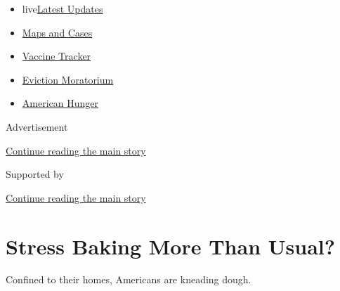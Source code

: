 \begin{itemize}
\tightlist
\item
  live\href{https://www.nytimes3xbfgragh.onion/2020/09/08/world/covid-19-coronavirus.html?name=styln-coronavirus-national\&region=TOP_BANNER\&block=storyline_menu_recirc\&action=click\&pgtype=Article\&impression_id=808c40d0-f267-11ea-aa98-cfc271ad1787\&variant=undefined}{Latest
  Updates}
\item
  \href{https://www.nytimes3xbfgragh.onion/interactive/2020/us/coronavirus-us-cases.html?name=styln-coronavirus-national\&region=TOP_BANNER\&block=storyline_menu_recirc\&action=click\&pgtype=Article\&impression_id=808c40d1-f267-11ea-aa98-cfc271ad1787\&variant=undefined}{Maps
  and Cases}
\item
  \href{https://www.nytimes3xbfgragh.onion/interactive/2020/science/coronavirus-vaccine-tracker.html?name=styln-coronavirus-national\&region=TOP_BANNER\&block=storyline_menu_recirc\&action=click\&pgtype=Article\&impression_id=808c40d2-f267-11ea-aa98-cfc271ad1787\&variant=undefined}{Vaccine
  Tracker}
\item
  \href{https://www.nytimes3xbfgragh.onion/2020/09/02/your-money/eviction-moratorium-covid.html?name=styln-coronavirus-national\&region=TOP_BANNER\&block=storyline_menu_recirc\&action=click\&pgtype=Article\&impression_id=808c40d3-f267-11ea-aa98-cfc271ad1787\&variant=undefined}{Eviction
  Moratorium}
\item
  \href{https://www.nytimes3xbfgragh.onion/interactive/2020/09/02/magazine/food-insecurity-hunger-us.html?name=styln-coronavirus-national\&region=TOP_BANNER\&block=storyline_menu_recirc\&action=click\&pgtype=Article\&impression_id=808c40d4-f267-11ea-aa98-cfc271ad1787\&variant=undefined}{American
  Hunger}
\end{itemize}

Advertisement

\protect\hyperlink{after-top}{Continue reading the main story}

Supported by

\protect\hyperlink{after-sponsor}{Continue reading the main story}

\hypertarget{stress-baking-more-than-usual}{%
\section{Stress Baking More Than
Usual?}\label{stress-baking-more-than-usual}}

Confined to their homes, Americans are kneading dough.

